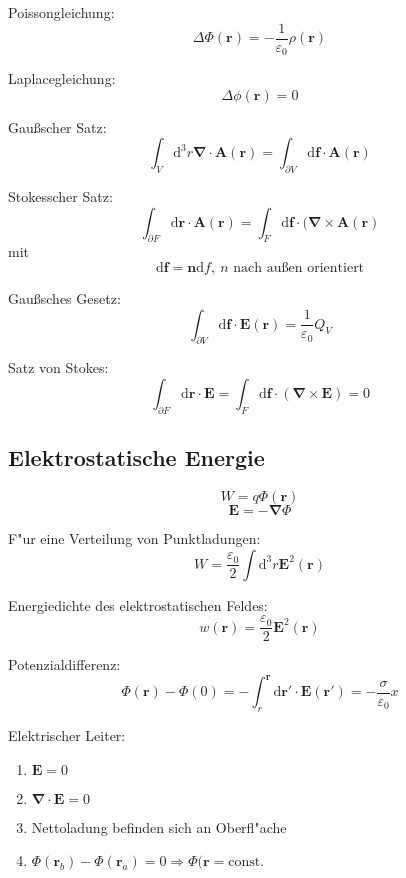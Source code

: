 \documentclass[titlepage,11pt,a4paper,ngerman]{report}
\newcommand{\tx}[1]{\textrm{#1}}
\newcommand{\const}{\tx{const.}}
\newcommand{\dd}{\mathrm{d}}
\renewcommand{\vec}[1]{\bm{#1}}
\newcommand{\vabla}{\vec{\nabla}}
\newcommand{\vepsilon}{\varepsilon}
\begin{document}
Poissongleichung:
\[\Delta\Phi(\vec{r})=-\frac{1}{\vepsilon_0}\rho(\vec{r})\]

Laplacegleichung:
\[\Delta\phi(\vec{r})=0\]

Gau\ss scher Satz:
\[\int_V\dd^3r\vabla\cdot\vec{A}(\vec{r})=\int_{\partial V}\dd\vec{f}\cdot\vec{A}(\vec{r})\]

Stokesscher Satz:
\[\int_{\partial F}\dd\vec{r}\cdot\vec{A}(\vec{r})=\int_F\dd\vec{f}\cdot(\vabla\times\vec{A}(\vec{r})\]
mit \[\dd\vec{f}=\vec{n}\dd f,\ n\textrm{ nach au\ss en orientiert}\]

Gau\ss sches Gesetz:
\[\int_{\partial V}\dd\vec{f}\cdot\vec{E}(\vec{r})=\frac{1}{\vepsilon_0}Q_V\]

Satz von Stokes:
\[\int_{\partial F}\dd\vec{r}\cdot\vec{E}=\int_F\dd\vec{f}\cdot(\vabla\times\vec{E})=0\]

\subsection{Elektrostatische Energie}

\[W=q\Phi(\vec{r})\]
\[\vec{E}=-\vabla\Phi\]

F"ur eine Verteilung von Punktladungen:
\[W=\frac{\vepsilon_0}{2}\int\dd^3r\vec{E}^2(\vec{r})\]

Energiedichte des elektrostatischen Feldes:
\[w(\vec{r})=\frac{\vepsilon_0}{2}\vec{E}^2(\vec{r})\]

Potenzialdifferenz:
\[\Phi(\vec{r})-\Phi(0)=-\int_r^{\vec{r}}\dd\vec{r}'\cdot\vec{E}(\vec{r}')=-\frac{\sigma}{\vepsilon_0}x\]

Elektrischer Leiter:
\begin{enumerate}
\item $\vec{E}=0$
\item $\vabla\cdot\vec{E}=0$
\item Nettoladung befinden sich an Oberfl"ache
\item $\Phi(\vec{r}_b)-\Phi(\vec{r}_a)=0\Rightarrow\Phi(\vec{r}=\const$
\end{enumerate}
\end{document}
